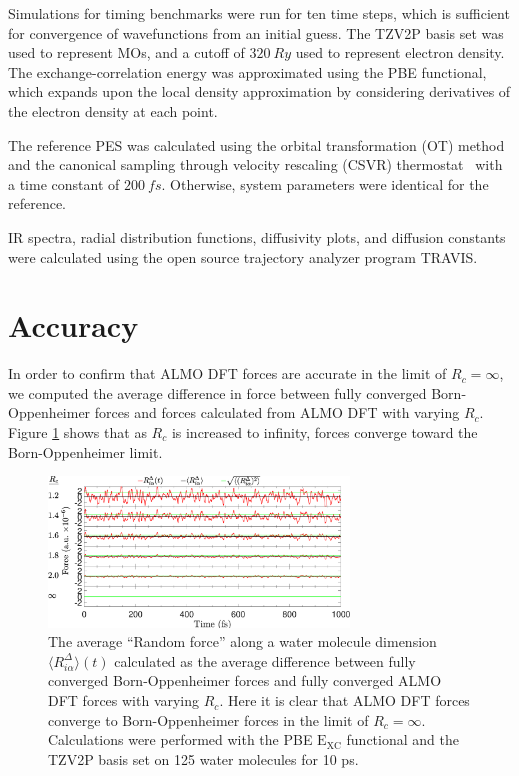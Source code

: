 \documentclass[10pt,aps,prl,twocolumn,amsmath,amssymb,superscriptaddress,longbibliography]{revtex4-1}
\begin{document}
Simulations for timing benchmarks were run for ten time steps, which is sufficient for convergence of wavefunctions from an initial guess.
The TZV2P basis set was used to represent MOs, and a cutoff of $\SI{320}{Ry}$ used to represent electron density. 
The exchange-correlation energy was approximated using the PBE functional, which expands upon the local density approximation by considering derivatives of the electron density at each point.~\cite{a:PBEfunctional} 

The reference PES was calculated using the orbital transformation (OT) method~\cite{a:ot,a:ot2} and the canonical sampling through velocity rescaling (CSVR) thermostat~\cite{a:CSVR} with a time constant of $\SI{200}{fs}$. 
Otherwise, system parameters were identical for the reference.

IR spectra, radial distribution functions, diffusivity plots, and diffusion constants were calculated using the open source trajectory analyzer program TRAVIS.~\cite{a:travis-main,a:travis-ir1,a:travis-ir2}

\section{Accuracy}

In order to confirm that ALMO DFT forces are accurate in the limit of $R_{c} = \infty$, we computed the average difference in force between fully converged Born-Oppenheimer forces and forces calculated from ALMO DFT with varying $R_{c}$. Figure \ref{fig:forcecomp} shows that as $R_{c}$ is increased to infinity, forces converge toward the Born-Oppenheimer limit.

\begin{figure}
\includegraphics[trim={0.1cm 0cm 0cm 0cm},clip,width=8cm]{DeltaForceComparison_ALMO_SCF.eps}
\caption{\label{fig:forcecomp}The average ``Random force'' along a water molecule dimension $\langle R^{\Delta}_{i\alpha} \rangle (t)$ calculated as the average difference between fully converged Born-Oppenheimer forces and fully converged ALMO DFT forces with varying $R_{c}$.
Here it is clear that ALMO DFT forces converge to Born-Oppenheimer forces in the limit of $R_{c} = \infty$.
Calculations were performed with the PBE $\mathrm{E_{XC}}$ functional and the TZV2P basis set on 125 water molecules for 10 ps.}
\end{figure}
\end{document}

